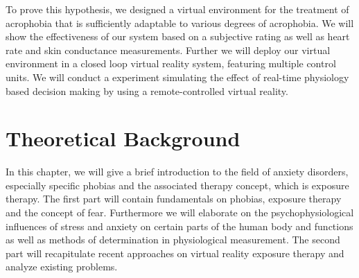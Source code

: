 To prove this hypothesis, we designed a virtual environment for the treatment of acrophobia that is sufficiently adaptable to various degrees of acrophobia. We will show the effectiveness of our system based on a subjective rating as well as heart rate and skin conductance measurements. Further we will deploy our virtual environment in a closed loop virtual reality system, featuring multiple control units. We will conduct a experiment simulating the effect of real-time physiology based decision making by using a remote-controlled virtual reality.\\



\section{Theoretical Background}

In this chapter, we will give a brief introduction to the field of anxiety disorders, especially specific phobias and the associated therapy concept, which is exposure therapy. The first part will contain fundamentals on phobias, exposure therapy and the concept of fear. Furthermore we will elaborate on the psychophysiological influences of stress and anxiety on certain parts of the human body and functions as well as methods of determination in physiological measurement. The second part will recapitulate recent approaches on virtual reality exposure therapy and analyze existing problems. 


